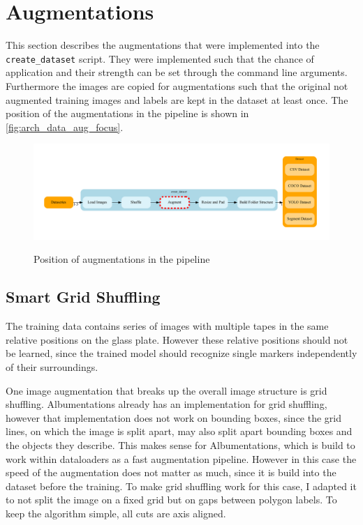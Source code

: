 \documentclass[10pt]{book}
\begin{document}
\section{Augmentations}

This section describes the augmentations that were implemented into the \texttt{create\_dataset} script. They were implemented such that the chance of application and their strength can be set through the command line arguments. Furthermore the images are copied for augmentations such that the original not augmented training images and labels are kept in the dataset at least once. The position of the augmentations in the pipeline is shown in \autoref{fig:arch_data_aug_focus}.

\begin{figure}
  \caption{Position of augmentations in the pipeline}
  \includegraphics[width=\textwidth]{graph/arch_data_aug_focus}
  \label{fig:arch_data_aug_focus}
\end{figure}

\subsection{Smart Grid Shuffling}

The training data contains series of images with multiple tapes in the same relative positions on the glass plate. However these relative positions should not be learned, since the trained model should recognize single markers independently of their surroundings. 

One image augmentation that breaks up the overall image structure is grid shuffling. Albumentations already has an implementation for grid shuffling, however that implementation does not work on bounding boxes, since the grid lines, on which the image is split apart, may also split apart bounding boxes and the objects they describe. This makes sense for Albumentations, which is build to work within dataloaders as a fast augmentation pipeline. However in this case the speed of the augmentation does not matter as much, since it is build into the dataset before the training. To make grid shuffling work for this case, I adapted it to not split the image on a fixed grid but on gaps between polygon labels. To keep the algorithm simple, all cuts are axis aligned.
\end{document}
